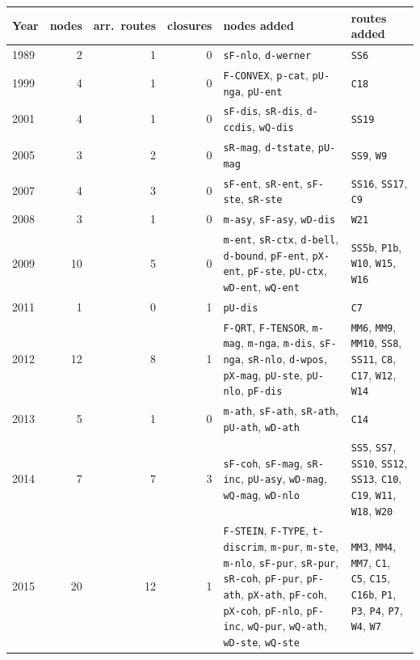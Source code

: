 \begin{longtable}{@{}lrrrp{3.4cm}p{5.6cm}@{}}\toprule
Year & nodes & arr.\ routes & closures & nodes added & routes added \\\midrule\endhead
1989 & 2 & 1 & 0 & \texttt{sF-nlo}, \texttt{d-werner} & \texttt{SS6} \\
1999 & 4 & 1 & 0 & \texttt{F-CONVEX}, \texttt{p-cat}, \texttt{pU-nga}, \texttt{pU-ent} & \texttt{C18} \\
2001 & 4 & 1 & 0 & \texttt{sF-dis}, \texttt{sR-dis}, \texttt{d-ccdis}, \texttt{wQ-dis} & \texttt{SS19} \\
2005 & 3 & 2 & 0 & \texttt{sR-mag}, \texttt{d-tstate}, \texttt{pU-mag} & \texttt{SS9}, \texttt{W9} \\
2007 & 4 & 3 & 0 & \texttt{sF-ent}, \texttt{sR-ent}, \texttt{sF-ste}, \texttt{sR-ste} & \texttt{SS16}, \texttt{SS17}, \texttt{C9} \\
2008 & 3 & 1 & 0 & \texttt{m-asy}, \texttt{sF-asy}, \texttt{wD-dis} & \texttt{W21} \\
2009 & 10 & 5 & 0 & \texttt{m-ent}, \texttt{sR-ctx}, \texttt{d-bell}, \texttt{d-bound}, \texttt{pF-ent}, \texttt{pX-ent}, \texttt{pF-ste}, \texttt{pU-ctx}, \texttt{wD-ent}, \texttt{wQ-ent} & \texttt{SS5b}, \texttt{P1b}, \texttt{W10}, \texttt{W15}, \texttt{W16} \\
2011 & 1 & 0 & 1 & \texttt{pU-dis} & \texttt{C7} \\
2012 & 12 & 8 & 1 & \texttt{F-QRT}, \texttt{F-TENSOR}, \texttt{m-mag}, \texttt{m-nga}, \texttt{m-dis}, \texttt{sF-nga}, \texttt{sR-nlo}, \texttt{d-wpos}, \texttt{pX-mag}, \texttt{pU-ste}, \texttt{pU-nlo}, \texttt{pF-dis} & \texttt{MM6}, \texttt{MM9}, \texttt{MM10}, \texttt{SS8}, \texttt{SS11}, \texttt{C8}, \texttt{C17}, \texttt{W12}, \texttt{W14} \\
2013 & 5 & 1 & 0 & \texttt{m-ath}, \texttt{sF-ath}, \texttt{sR-ath}, \texttt{pU-ath}, \texttt{wD-ath} & \texttt{C14} \\
2014 & 7 & 7 & 3 & \texttt{sF-coh}, \texttt{sF-mag}, \texttt{sR-inc}, \texttt{pU-asy}, \texttt{wD-mag}, \texttt{wQ-mag}, \texttt{wD-nlo} & \texttt{SS5}, \texttt{SS7}, \texttt{SS10}, \texttt{SS12}, \texttt{SS13}, \texttt{C10}, \texttt{C19}, \texttt{W11}, \texttt{W18}, \texttt{W20} \\
2015 & 20 & 12 & 1 & \texttt{F-STEIN}, \texttt{F-TYPE}, \texttt{t-discrim}, \texttt{m-pur}, \texttt{m-ste}, \texttt{m-nlo}, \texttt{sF-pur}, \texttt{sR-pur}, \texttt{sR-coh}, \texttt{pF-pur}, \texttt{pF-ath}, \texttt{pX-ath}, \texttt{pF-coh}, \texttt{pX-coh}, \texttt{pF-nlo}, \texttt{pF-inc}, \texttt{wQ-pur}, \texttt{wQ-ath}, \texttt{wD-ste}, \texttt{wQ-ste} & \texttt{MM3}, \texttt{MM4}, \texttt{MM7}, \texttt{C1}, \texttt{C5}, \texttt{C15}, \texttt{C16b}, \texttt{P1}, \texttt{P3}, \texttt{P4}, \texttt{P7}, \texttt{W4}, \texttt{W7} \\

\end{longtable}
